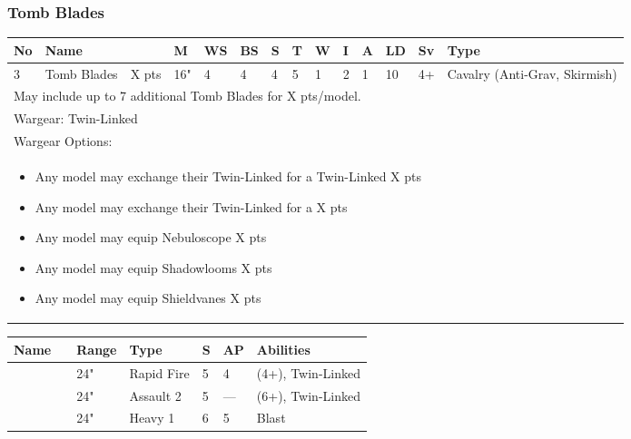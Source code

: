 \newpage
\subsubsection{Tomb Blades}

\noindent
\begin{tabular}{||m{10pt} m{95pt} m{30pt} m{11pt} m{11pt} m{11pt} m{11pt} m{11pt} m{11pt} m{11pt} m{11pt} m{11pt} m{11pt} m{125pt}||}
	\hline
	No & Name & & M & WS & BS & S & T & W & I & A & LD & Sv & Type \\
	\hline
	3 & Tomb Blades & X pts & 16" & 4 & 4 & 4 & 5 & 1 & 2 & 1 & 10 & 4+ & Cavalry (Anti-Grav, Skirmish)\\
	\hline
	\hline
	\multicolumn{14}{||Z{532 pt}||}{May include up to 7 additional Tomb Blades for X pts/model.}\\		
	\hline
	\hline
	\multicolumn{14}{||Z{532 pt}||}{Wargear: Twin-Linked \quickref{Gauss Blaster}}\\
	\multicolumn{14}{||Z{532 pt}||}{Wargear Options:} \\	\multicolumn{14}{||Z{532 pt}||}{\begin{itemize}
			\item Any model may exchange their Twin-Linked \quickref{Gauss Blaster} for a Twin-Linked \quickref{Tesla Carbine} \hrulefill X pts
			\item Any model may exchange their Twin-Linked \quickref{Gauss Blaster} for a \quickref{Particle Beamer} \hrulefill X pts
			\item Any model may equip Nebuloscope \hrulefill X pts
			\item Any model may equip Shadowlooms \hrulefill X pts
			\item Any model may equip Shieldvanes \hrulefill X pts
	\end{itemize}} \\
	\hline
\end{tabular}

\noindent
\begin{tabular}{||m{110pt} m{30pt} m{31pt} m{55pt} m{12pt} m{12pt} m{210pt}||}
	\hline
	Name & & Range & Type & S & AP & Abilities \\
	\hline
	\quickref{Gauss Blaster} & & 24" & Rapid Fire & 5 & 4 & \quickref{Gauss} (4+), Twin-Linked \\
	\quickref{Tesla Carbine} & & 24" & Assault 2 & 5 & — & \quickref{Tesla} (6+), Twin-Linked \\
	\quickref{Particle Beamer} & & 24" & Heavy 1 & 6 & 5 & Blast \\
	\hline
\end{tabular}

